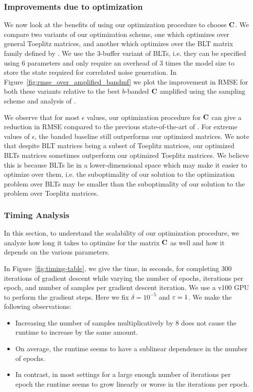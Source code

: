 \subsubsection{Improvements due to optimization}

We now look at the benefits of using our optimization procedure to choose $\mathbf{C}$. We compare two variants of our optimization scheme, one which optimizes over general Toeplitz matrices, and another which optimizes over the BLT matrix family defined by \citet{dvijotham2024efficientnearoptimalnoisegeneration}. We use the 3-buffer variant of BLTs, i.e. they can be specified using 6 parameters and only require an overhead of 3 times the model size to store the state required for correlated noise generation. In Figure~\ref{fig:rmse_over_amplified_bandmf} we plot the improvement in RMSE for both these variants relative to the best $b$-banded $\mathbf{C}$ amplified using the sampling scheme and analysis of \citet{choquette2024amplified}. 

We observe that for most $\epsilon$ values, our optimization procedure for $\mathbf{C}$ can give a reduction in RMSE compared to the previous state-of-the-art of \citet{choquette2024amplified}. For extreme values of $\epsilon$, the banded baseline still outperforms our optimized matrices. We note that despite BLT matrices being a subset of Toeplitz matrices, our optimized BLTs matrices sometimes outperform our optimized Toeplitz matrices. We believe this is because BLTs lie in a lower-dimensional space which may make it easier to optimize over them, i.e. the suboptimality of our solution to the optimization problem over BLTs may be smaller than the suboptimality of our solution to the problem over Toeplitz matrices.


\subsubsection{Timing Analysis}

In this section, to understand the scalability of our optimization procedure, we analyze how long it takes to optimize for the matrix $\mathbf{C}$ as well and how it depends on the various parameters.

In Figure~\ref{fig:timing-table}, we give the time, in seconds, for completing 300 iterations of gradient descent while varying the number of epochs, iterations per epoch, and number of samples per gradient descent iteration. We use a v100 GPU to perform the gradient steps. Here we fix $\delta = 10^{-5}$ and $\varepsilon=1$. We make the following observations:
\begin{itemize}
    \item Increasing the number of samples multiplicatively by 8 does not cause the runtime to increase by the same amount.
    \item On average, the runtime seems to have a sublinear dependence in the number of epochs.
    \item In contrast, in most settings for a large enough number of iterations per epoch the runtime seems to grow linearly or worse in the iterations per epoch.
\end{itemize}


